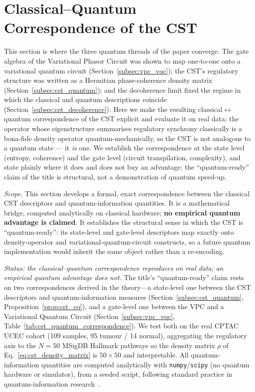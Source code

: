 \documentclass[preprint,12pt,amsmath,amssymb,superscriptaddress,floatfix]{revtex4-2}
\begin{document}
\section{Classical--Quantum Correspondence of the CST}
\label{sec:quantum_correspondence}
This section is where the three quantum threads of the paper converge. The gate
algebra of the Variational Phasor Circuit was shown to map one-to-one onto a
variational quantum circuit (Section~\ref{subsec:vpc_vqc}); the CST's regulatory
structure was written as a Hermitian phase-coherence density matrix
(Section~\ref{subsec:cst_quantum}); and the decoherence limit fixed the regime in
which the classical and quantum descriptions coincide
(Section~\ref{subsec:cst_decoherence}). Here we make the resulting
classical$\leftrightarrow$quantum correspondence of the CST explicit and evaluate
it on real data: the operator whose eigenstructure summarises regulatory synchrony
classically is a bona-fide density operator quantum-mechanically, so the CST is
not analogous to a quantum state --- it \emph{is} one. We establish the
correspondence at the state level (entropy, coherence) and the gate level
(circuit transpilation, complexity), and state plainly where it does and does not
buy an advantage: the ``quantum-ready'' claim of the title is structural, not a
demonstration of quantum speed-up.
\label{sec:quantum_validation}

\emph{Scope.} This section develops a formal, exact correspondence between the classical CST descriptors and quantum-information quantities. It is a mathematical bridge, computed analytically on classical hardware; \textbf{no empirical quantum advantage is claimed}. It establishes the structural sense in which the CST is ``quantum-ready'': its state-level and gate-level descriptors map exactly onto density-operator and variational-quantum-circuit constructs, so a future quantum implementation would inherit the same object rather than a re-encoding.

\emph{Status: the classical--quantum correspondence reproduces on real data;
an empirical quantum advantage does not.} The title's ``quantum-ready'' claim
rests on two correspondences derived in the theory---a state-level one between
the CST descriptors and quantum-information measures
(Section~\ref{subsec:cst_quantum}, Proposition~\ref{prop:cst_cq}), and a
gate-level one between the VPC and a Variational Quantum Circuit
(Section~\ref{subsec:vpc_vqc}, Table~\ref{tab:cst_quantum_correspondence}). We
test both on the real CPTAC UCEC cohort (109 samples, 95 tumour / 14 normal),
aggregating the regulatory axis to the $N=50$ MSigDB Hallmark pathways so the
density matrix $\rho$ of Eq.~\ref{eq:cst_density_matrix} is $50\times50$ and
interpretable. All quantum-information quantities are computed analytically with
\texttt{numpy}/\texttt{scipy} (no quantum hardware or simulator), from a seeded
script, following standard practice in quantum-information
research~\cite{biamonte2017quantum}.
\end{document}
